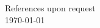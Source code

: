 \documentclass{article}
\begin{document}
\begin{paracol}{2}
\begin{rightcolumn}
    \vspace{3em}

    References upon request \\
    \today

    \flushpage

    \par\vfill

  \end{rightcolumn}
\end{paracol}
\end{document}
